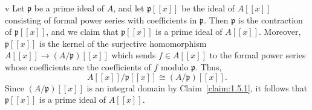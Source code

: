 \begin{partsolution}{1}{5}{v}
Let \(\mathfrak{p}\) be a prime ideal of \(A\), and let \(\mathfrak{p}[[x]]\) be the ideal of \(A[[x]]\) consisting of formal power series with coefficients in \(\mathfrak{p}\).
Then \(\mathfrak{p}\) is the contraction of \(\mathfrak{p}[[x]]\), and we claim that \(\mathfrak{p}[[x]]\) is a prime ideal of \(A[[x]]\).
Moreover, \(\mathfrak{p}[[x]]\) is the kernel of the surjective homomorphism \(A[[x]] \to (A / \mathfrak{p})[[x]]\) which sends \(f \in A[[x]]\) to the formal power series whose coefficients are the coefficients of \(f\) modulo \(\mathfrak{p}\).
Thus,
\begin{equation*}
A[[x]] / \mathfrak{p}[[x]] \cong (A / \mathfrak{p})[[x]].
\end{equation*}
Since \((A / \mathfrak{p})[[x]]\) is an integral domain by Claim~\ref{claim:1.5.1}, it follows that \(\mathfrak{p}[[x]]\) is a prime ideal of \(A[[x]]\).
\end{partsolution}